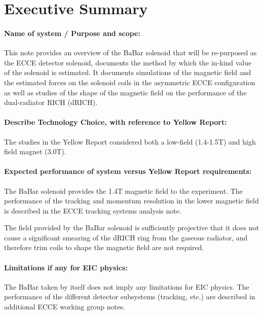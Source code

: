 %

\section{Executive Summary}

\paragraph{Name of system / Purpose and scope: \\}
This note provides an overview of the BaBar solenoid that will be re-purposed as the ECCE detector solenoid, documents the method by which the in-kind value of the solenoid is estimated. It documents simulations of the magnetic field and the estimated forces on the solenoid coils in the asymmetric ECCE configuration as well as studies of the shape of the magnetic field on the performance of the dual-radiator RICH (dRICH). 

\paragraph{Describe Technology Choice, with reference to Yellow Report: \\}
The studies in the Yellow Report considered both a low-field (1.4-1.5T) and high field magnet (3.0T). 

\paragraph{Expected performance of system versus Yellow Report requirements: \\}
The BaBar solenoid provides the 1.4T magnetic field to the experiment. The performance of the tracking and momentum resolution in the lower magnetic field is described in the ECCE tracking systems analysis note. 

The field provided by the BaBar solenoid is sufficiently projective that it does not cause a significant smearing of the dRICH ring from the gaseous radiator, and therefore trim coils to shape the magnetic field are not required.  


\paragraph{Limitations if any for EIC physics: \\}
The BaBar taken by itself does not imply any limitations for EIC physics.  The performance of the different detector subsystems (tracking, etc.) are described in additional ECCE working group notes. 
